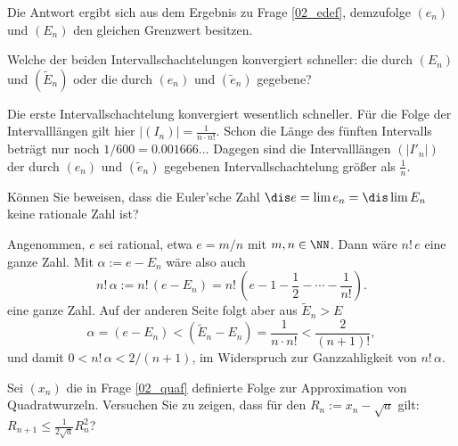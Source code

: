 \begin{antwort}
  Die Antwort ergibt sich aus dem Ergebnis zu Frage \ref{02_edef}, 
  demzufolge $(e_n)$ und $(E_n)$ 
  den gleichen Grenzwert besitzen. 
  \AntEnd
\end{antwort} 

\begin{frage}
  Welche der beiden Intervallschachtelungen konvergiert schneller: die durch 
  $(E_n)$ und $(\widetilde{E}_n)$ oder die durch 
  $(e_n)$ und $(\widetilde{e}_n)$ gegebene?
\end{frage}

\begin{antwort}
  Die erste Intervallschachtelung konvergiert wesentlich schneller. Für die 
  Folge der Intervalllängen gilt hier $|(I_n)|=\frac{1}{n\cdot n!}$. 
  Schon die Länge des fünften Intervalls beträgt nur noch $1/600=0.001666\ldots$
  Dagegen sind die Intervalllängen $(|I'_n|)$ 
  der durch $(e_n)$ und $(\widetilde{e}_n)$ gegebenen Intervallschachtelung 
  größer als $\frac{1}{n}$.  
  \AntEnd
\end{antwort}

\begin{frage}%
  \label{02_eirr}
  Können Sie beweisen, dass die Euler'sche Zahl 
  $\dis e=\lim e_n = \dis \lim E_n$ keine rationale Zahl ist?
\end{frage}

\begin{antwort}
  Angenommen, $e$ sei rational, etwa $e=m/n$ mit $m,n \in \NN$. Dann wäre
  $n!\, e$ eine ganze Zahl. Mit $\alpha := e-E_n$ wäre also auch  
  \[
  n!\,\alpha := n! \,\left( e- E_n \right) = 
  n!\, \left( e - 1-\frac{1}{2} - \cdots - \frac{1}{n!} \right).
  \]
  eine ganze Zahl. Auf der anderen Seite folgt aber aus $\widetilde{E}_n > E$ 
  \[
  \alpha = ( e-E_n ) < ( \widetilde{E}_n - E_n ) = \frac{1}{n\cdot n!} < \frac{2}{(n+1)!},
  \] 
  und damit $0<n! \, \alpha < 2/(n+1)$, im Widerspruch zur Ganzzahligkeit von 
  $n! \, \alpha$. 
  \AntEnd 
\end{antwort}

\begin{frage}%
  \label{02_fqua}
  Sei $(x_n)$ die in Frage \ref{02_quaf} definierte Folge zur Approximation 
  von Quadratwurzeln. 
  Versuchen Sie zu zeigen, dass  
  für den  $R_n := x_n-\sqrt{a}$ gilt: $
  R_{n+1} \le \frac{1}{2\sqrt{a}} R_n^2$?
\end{frage}

